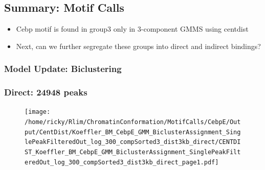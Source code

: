 \documentclass[notes]{beamer}
\begin{document}
\subsection{Summary: Motif Calls}
\begin{frame}
    \begin{itemize}[<+->]
        \item Cebp motif is found in group3 only in 3-component GMMS using centdist
        \item Next, can we further segregate these groups into direct and indirect bindings?
    \end{itemize}
\end{frame} 

\subsubsection{Model Update: Biclustering}
{ %
    \begin{frame}[plain]
     \end{frame}
}

\begin{frame}[plain]
    \frametitle{Direct: 24948 peaks}
    \begin{figure}
        \texttt{[image: /home/ricky/Rlim/ChromatinConformation/MotifCalls/CebpE/Output/CentDist/Koeffler\_BM\_CebpE\_GMM\_BiclusterAssignment\_SinglePeakFilteredOut\_log\_300\_compSorted3\_dist3kb\_direct/CENTDIST\_Koeffler\_BM\_CebpE\_GMM\_BiclusterAssignment\_SinglePeakFilteredOut\_log\_300\_compSorted3\_dist3kb\_direct\_page1.pdf]}
    \end{figure}
\end{frame}
\end{document}
